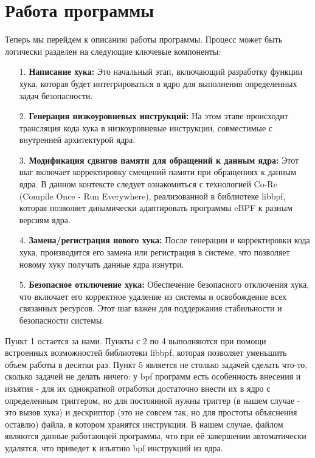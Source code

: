 \chapter{Работа программы}
\label{program}


\begin{flushleft}
	Теперь мы перейдем к описанию работы программы. Процесс может быть логически разделен на следующие ключевые компоненты:
	
	\begin{itemize}
		\item[1.] \textbf{Написание хука: } Это начальный этап, включающий разработку функции хука, которая будет интегрироваться в ядро для выполнения определенных задач безопасности.
		\item[2.] \textbf{Генерация низкоуровневых инструкций: } На этом этапе происходит трансляция кода хука в низкоуровневые инструкции, совместимые с внутренней архитектурой ядра.
		\item[3.] \textbf{Модификация сдвигов памяти для обращений к данным ядра: } Этот шаг включает корректировку смещений памяти при обращениях к данным ядра. В данном контексте следует ознакомиться с технологией Co-Re (Compile Once - Run Everywhere), реализованной в библиотеке libbpf, которая позволяет динамически адаптировать программы eBPF к разным версиям ядра.
		\item[4.] \textbf{Замена/регистрация нового хука: } После генерации и корректировки кода хука, производится его замена или регистрация в системе, что позволяет новому хуку получать данные ядра изнутри.
		\item[5.] \textbf{Безопасное отключение хука: } Обеспечение безопасного отключения хука, что включает его корректное удаление из системы и освобождение всех связанных ресурсов. Этот шаг важен для поддержания стабильности и безопасности системы.
	\end{itemize}
	
	Пункт 1 остается за нами. Пункты с 2 по 4 выполняются при помощи встроенных возможностей библиотеки libbpf, которая позволяет уменьшить объем работы в десятки раз. Пункт 5 является не столько задачей сделать что-то, сколько задачей не делать ничего: у bpf программ есть особенность внесения и изъятия - для их однократной отработки достаточно внести их в ядро с определенным триггером, но для постоянной нужны триггер (в нашем случае - это вызов хука) и дескриптор (это не совсем так, но для простоты объяснения оставлю) файла, в котором хранятся инструкции. В нашем случае, файлом являются данные работающей программы, что при её завершении автоматически удалятся, что приведет к изъятию bpf инструкций из ядра.
\end{flushleft}